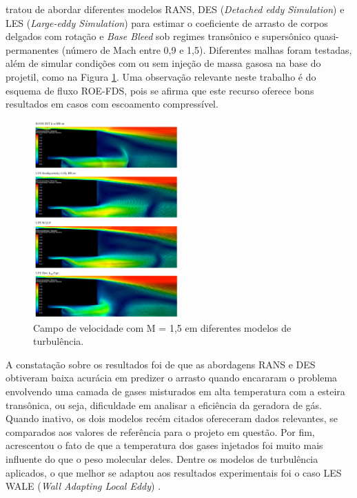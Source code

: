 \citeauthor{nicolas-perez_accuracy_2017} tratou de abordar diferentes modelos RANS, DES (\textit{Detached eddy Simulation}) e LES (\textit{Large-eddy Simulation}) para estimar o coeficiente de arrasto de corpos delgados com rotação e \textit{Base Bleed} sob regimes transônico e supersônico quasi-permanentes (número de Mach entre 0,9 e 1,5). Diferentes malhas foram testadas, além de simular condições com ou sem injeção de massa gasosa na base do projetil, como na Figura \ref{fig10:nicolas2017}. Uma observação relevante neste trabalho é do esquema de fluxo ROE-FDS, pois se afirma que este recurso oferece bons resultados em casos com escoamento compressível.

\begin{figure}[!ht]
	\centering
    \includegraphics[width=0.5\textwidth]{chapter-01/img-cap01/foto10-nicolas2017}
	\caption[Campo de velocidade com M = 1,5 em diferentes modelos de turbulência.]{Campo de velocidade com M = 1,5 em diferentes modelos de turbulência. \cite{nicolas-perez_accuracy_2017}}
	\label{fig10:nicolas2017}
\end{figure}

A constatação sobre os resultados foi de que as abordagens RANS e DES obtiveram baixa acurácia em predizer o arrasto quando encararam o problema envolvendo uma camada de gases misturados em alta temperatura com a esteira transônica, ou seja, dificuldade em analisar a eficiência da geradora de gás. Quando inativo, os dois modelos recém citados ofereceram dados relevantes, se comparados aos valores de referência para o projeto em questão. Por fim, acrescentou o fato de que a temperatura dos gases injetados foi muito mais influente do que o peso molecular deles. Dentre os modelos de turbulência aplicados, o que melhor se adaptou aos resultados experimentais foi o caso LES WALE (\textit{Wall Adapting Local Eddy}) \cite{nicolas-perez_accuracy_2017}.

